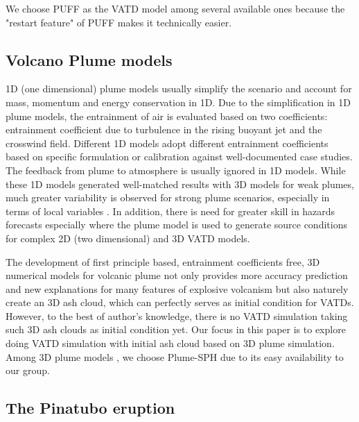 We choose PUFF \citep{searcy1998puff} as the VATD model among several available ones \citep[e.g.][]{searcy1998puff,schwaiger2012ash3d} because the "restart feature" of PUFF makes it technically easier.

\subsection{Volcano Plume models}

1D (one dimensional) plume models \citep{woods1988fluid, bursik2001effect, mastin2007user, degruyter2012improving, woodhouse2013interaction, devenish2013using, de2015plume, folch2016fplume, pouget2016sensitivity} usually simplify the scenario and account for mass, momentum and energy conservation in 1D. Due to the simplification in 1D plume models, the entrainment of air is evaluated based on two coefficients: entrainment coefficient due to turbulence in the rising buoyant jet and the crosswind field. Different 1D models adopt different entrainment coefficients based on specific formulation or calibration against well-documented case studies. The feedback from plume to atmosphere is usually ignored in 1D models. While these 1D models generated well-matched results with 3D models for weak plumes, much greater variability is observed for strong plume scenarios, especially in terms of local variables \citep{costa2016results}. In addition, there is need for greater skill in hazards forecasts especially where the plume model is used to generate source conditions for complex 2D (two dimensional) and 3D VATD models.

The development of first principle based, entrainment coefficients free, 3D numerical models for volcanic plume not only provides more accuracy prediction and new explanations for many features of explosive volcanism but also naturely create an 3D ash cloud, which can perfectly serves as initial condition for VATDs. However, to the best of author's knowledge, there is no VATD simulation taking such 3D ash clouds as initial condition yet. Our focus in this paper is to explore doing VATD simulation with initial ash cloud based on 3D plume simulation. Among 3D plume models \citep{oberhuber1998volcanic,neri2003multiparticle,suzuki2005numerical,cerminara2016ashee,gmd-2017-119}, we choose Plume-SPH \citep{gmd-2017-119} due to its easy availability to our group.

\subsection{The Pinatubo eruption}

